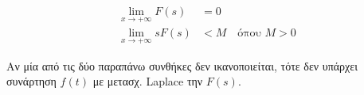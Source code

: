 





\pagestyle{empty}

\begin{align*}
\lim\limits_{x\to +\infty} F(s)&=0 \\
\lim\limits_{x\to +\infty} sF(s)&<M \quad\text{όπου $Μ>0$}
\end{align*}

Αν μία από τις δύο παραπάνω συνθήκες δεν ικανοποιείται, τότε δεν υπάρχει συνάρτηση $f(t)$ με μετασχ. \textlatin{Laplace} την $F(s)$.

